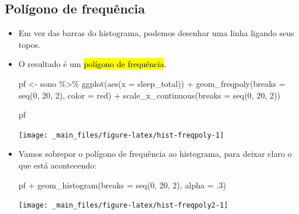 \documentclass[
  11pt]{report}
\newenvironment{Shaded}{\begin{snugshade}}{\end{snugshade}}
\newcommand{\AttributeTok}[1]{\textcolor[rgb]{0.77,0.63,0.00}{#1}}
\newcommand{\DecValTok}[1]{\textcolor[rgb]{0.00,0.00,0.81}{#1}}
\newcommand{\FunctionTok}[1]{\textcolor[rgb]{0.00,0.00,0.00}{#1}}
\newcommand{\NormalTok}[1]{#1}
\newcommand{\OtherTok}[1]{\textcolor[rgb]{0.56,0.35,0.01}{#1}}
\newcommand{\SpecialCharTok}[1]{\textcolor[rgb]{0.00,0.00,0.00}{#1}}
\newcommand{\StringTok}[1]{\textcolor[rgb]{0.31,0.60,0.02}{#1}}
\begin{document}
\hypertarget{poluxedgono-de-frequuxeancia}{%
\subsection{Polígono de frequência}\label{poluxedgono-de-frequuxeancia}}

\begin{itemize}
\item
  Em vez das barras do histograma, podemos desenhar uma linha ligando seus topos.
\item
  O resultado é um {\hl{polígono de frequência}}.

\begin{Shaded}
\begin{Highlighting}[]
\NormalTok{pf }\OtherTok{\textless{}{-}}\NormalTok{ sono }\SpecialCharTok{\%\textgreater{}\%} 
  \FunctionTok{ggplot}\NormalTok{(}\FunctionTok{aes}\NormalTok{(}\AttributeTok{x =}\NormalTok{ sleep\_total)) }\SpecialCharTok{+}
    \FunctionTok{geom\_freqpoly}\NormalTok{(}\AttributeTok{breaks =} \FunctionTok{seq}\NormalTok{(}\DecValTok{0}\NormalTok{, }\DecValTok{20}\NormalTok{, }\DecValTok{2}\NormalTok{), }\AttributeTok{color =} \StringTok{\textquotesingle{}red\textquotesingle{}}\NormalTok{) }\SpecialCharTok{+}
    \FunctionTok{scale\_x\_continuous}\NormalTok{(}\AttributeTok{breaks =} \FunctionTok{seq}\NormalTok{(}\DecValTok{0}\NormalTok{, }\DecValTok{20}\NormalTok{, }\DecValTok{2}\NormalTok{))}

\NormalTok{pf}
\end{Highlighting}
\end{Shaded}

  \begin{center}\texttt{[image: \_main\_files/figure-latex/hist-freqpoly-1]} \end{center}
\item
  Vamos sobrepor o polígono de frequência ao histograma, para deixar claro o que está acontecendo:

\begin{Shaded}
\begin{Highlighting}[]
\NormalTok{pf }\SpecialCharTok{+} \FunctionTok{geom\_histogram}\NormalTok{(}\AttributeTok{breaks =} \FunctionTok{seq}\NormalTok{(}\DecValTok{0}\NormalTok{, }\DecValTok{20}\NormalTok{, }\DecValTok{2}\NormalTok{), }\AttributeTok{alpha =}\NormalTok{ .}\DecValTok{3}\NormalTok{)}
\end{Highlighting}
\end{Shaded}

  \begin{center}\texttt{[image: \_main\_files/figure-latex/hist-freqpoly2-1]} \end{center}
\end{itemize}
\end{document}
